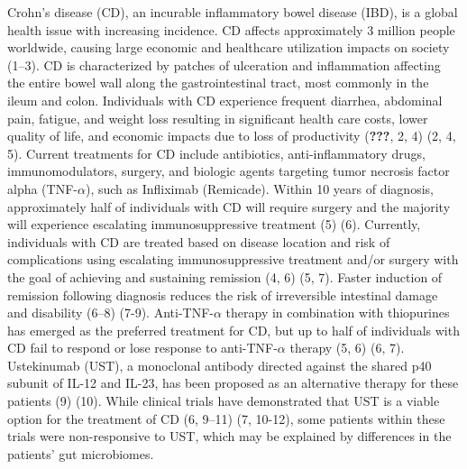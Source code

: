 \documentclass[11pt,]{article}
\begin{document}
Crohn's disease (CD), an incurable inflammatory bowel disease (IBD), is
a global health issue with increasing incidence. CD affects
approximately 3 million people worldwide, causing large economic and
healthcare utilization impacts on society (1--3). CD is characterized by
patches of ulceration and inflammation affecting the entire bowel wall
along the gastrointestinal tract, most commonly in the ileum and colon.
Individuals with CD experience frequent diarrhea, abdominal pain,
fatigue, and weight loss resulting in significant health care costs,
lower quality of life, and economic impacts due to loss of productivity
({\textbf{???}}, 2, 4) (2, 4, 5). Current treatments for CD include
antibiotics, anti-inflammatory drugs, immunomodulators, surgery, and
biologic agents targeting tumor necrosis factor alpha
(TNF-\({\alpha}\)), such as Infliximab (Remicade). Within 10 years of
diagnosis, approximately half of individuals with CD will require
surgery and the majority will experience escalating immunosuppressive
treatment (5) (6). Currently, individuals with CD are treated based on
disease location and risk of complications using escalating
immunosuppressive treatment and/or surgery with the goal of achieving
and sustaining remission (4, 6) (5, 7). Faster induction of remission
following diagnosis reduces the risk of irreversible intestinal damage
and disability (6--8) (7-9). Anti-TNF-\({\alpha}\) therapy in
combination with thiopurines has emerged as the preferred treatment for
CD, but up to half of individuals with CD fail to respond or lose
response to anti-TNF-\({\alpha}\) therapy (5, 6) (6, 7). Ustekinumab
(UST), a monoclonal antibody directed against the shared p40 subunit of
IL-12 and IL-23, has been proposed as an alternative therapy for these
patients (9) (10). While clinical trials have demonstrated that UST is a
viable option for the treatment of CD (6, 9--11) (7, 10-12), some
patients within these trials were non-responsive to UST, which may be
explained by differences in the patients' gut microbiomes.
\end{document}
